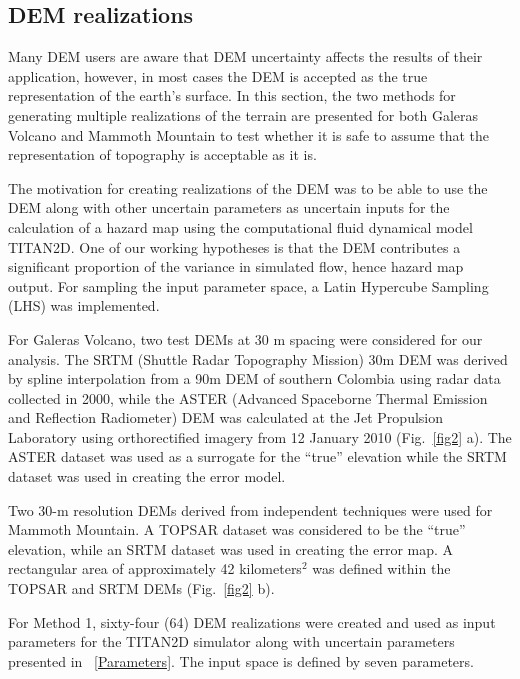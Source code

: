 \documentclass[12pt]{article}
\begin{document}
\subsection{DEM realizations}
Many DEM users are aware that DEM uncertainty affects the results of
their application, however, in most cases the DEM is accepted as the
true representation of the earth's surface. In this section, the two
methods for generating multiple realizations of the terrain are
presented for both Galeras Volcano and Mammoth Mountain to test
whether it is safe to assume that the representation of topography is
acceptable as it is.

The motivation for creating realizations of the DEM was to be able to
use the DEM along with other uncertain parameters as uncertain inputs
for the calculation of a hazard map using the computational fluid
dynamical model TITAN2D.  One of our working hypotheses is that the
DEM contributes a significant proportion of the variance in simulated
flow, hence hazard map output.  For sampling the input parameter
space, a Latin Hypercube Sampling (LHS) was implemented.

For Galeras Volcano, two test DEMs at 30 m spacing were considered for
our analysis. The SRTM (Shuttle Radar Topography Mission) 30m DEM was
derived by spline interpolation from a 90m DEM of southern Colombia
using radar data collected in 2000, while the ASTER (Advanced
Spaceborne Thermal Emission and Reflection Radiometer) DEM was
calculated at the Jet Propulsion Laboratory using orthorectified
imagery from 12 January 2010 (Fig.~\ref{fig2} a).  The ASTER dataset
was used as a surrogate for the ``true'' elevation while the SRTM
dataset was used in creating the error model.


Two 30-m resolution DEMs derived from independent techniques were used
for Mammoth Mountain.  A TOPSAR dataset was considered to be the
``true'' elevation, while an SRTM dataset was used in creating the
error map.  A rectangular area of approximately 42 kilometers$^2$ was
defined within the TOPSAR and SRTM DEMs (Fig.~\ref{fig2} b).

For Method 1, sixty-four (64) DEM realizations were created and used
as input parameters for the TITAN2D simulator along with uncertain
parameters presented in ~\ref{Parameters}.  The input space is defined
by seven parameters.


\end{document}
